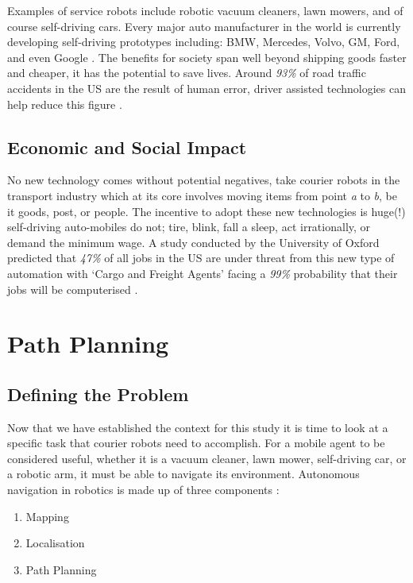 \noindent
Examples of service robots include robotic vacuum cleaners, lawn mowers, and of course self-driving cars. Every major auto manufacturer in the world is currently developing self-driving prototypes including: BMW, Mercedes, Volvo, GM, Ford, and even Google \cite{MIT}. The benefits for society span well beyond shipping goods faster and cheaper, it has the potential to save lives. Around \textit{93\%} of road traffic accidents in the US are the result of human error, driver assisted technologies can help reduce this figure \cite{ROAD}.

\subsection{Economic and Social Impact}
\noindent
No new technology comes without potential negatives, take courier robots in the transport industry which at its core involves moving items from point \textit{a} to \textit{b}, be it goods, post, or people. The incentive to adopt these new technologies is huge(!) self-driving auto-mobiles do not; tire, blink, fall a sleep, act irrationally, or demand the minimum wage. A study conducted by the University of Oxford predicted that \textit{47\%} of all jobs in the US are under threat from this new type of automation with `Cargo and Freight Agents' facing a \textit{99\%} probability that their jobs will be computerised \cite{OXFORD}. 


\section{Path Planning}

\subsection{Defining the Problem}
\noindent
Now that we have established the context for this study it is time to look at a specific task that courier robots need to accomplish. For a mobile agent to be considered useful, whether it is a vacuum cleaner, lawn mower, self-driving car, or a robotic arm, it must be able to navigate its environment. Autonomous navigation in robotics is made up of three components \cite{NEH}:

\begin{enumerate}
\item Mapping
\item Localisation
\item Path Planning
\end{enumerate}

